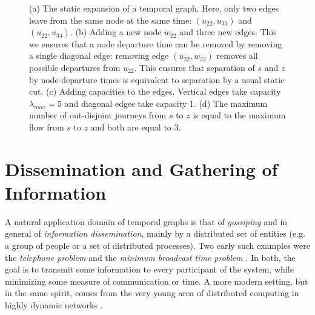 \documentclass[oribibl, 11pt]{llncs}
\begin{document}
\begin{figure}[!hbtp]
   \caption{(a) The static expansion of a temporal graph. Here, only two edges leave from the same node at the same time: $(u_{22},u_{33})$ and $(u_{22},u_{34})$. (b) Adding a new node $w_{22}$ and three new edges. This we ensures that a node departure time can be removed by removing a single diagonal edge: removing edge $(u_{22},w_{22})$ removes all possible departures from $u_{22}$. This ensures that separation of $s$ and $z$ by node-departure times is equivalent to separation by a usual static cut. (c) Adding capacities to the edges. Vertical edges take capacity $\lambda_{max}=5$ and diagonal edges take capacity 1. (d) The maximum number of out-disjoint journeys from $s$ to $z$ is equal to the maximum flow from $s$ to $z$ and both are equal to 3.} \label{fig:menger-example-expansion}
\end{figure}

\section{Dissemination and Gathering of Information}
\label{sec:dissemination}

A natural application domain of temporal graphs is that of \emph{gossiping} and in general of \emph{information dissemination}, mainly by a distributed set of entities (e.g. a group of people or a set of distributed processes). Two early such examples were the \emph{telephone problem} \cite{BS72} and the \emph{minimum broadcast time problem} \cite{Ra94}. In both, the goal is to transmit some information to every participant of the system, while minimizing some measure of communication or time. A more modern setting, but in the same spirit, comes from the very young area of distributed computing in highly dynamic networks \cite{OW05,KLO10,KO11,CFQS12,MCS14,MCS13b}. 
\end{document}
